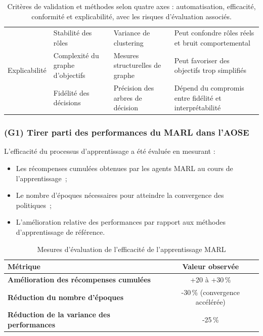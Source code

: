 \begin{table}[h!]
\begin{footnotesize}
\begin{tabular}{p{1.5cm}p{2.4cm}p{2.2cm}p{4.5cm}}
            \hline
            \multirow{3}{*}{Explicabilité}
                             & Stabilité des rôles              & Variance de clustering             & Peut confondre rôles réels et bruit comportemental                  \\
                             & Complexité du graphe d'objectifs & Mesures structurelles de graphe    & Peut favoriser des objectifs trop simplifiés                        \\
                             & Fidélité des décisions           & Précision des arbres de décision   & Dépend du compromis entre fidélité et interprétabilité              \\
            \hline
        \end{tabular}
        \caption{Critères de validation et méthodes selon quatre axes : automatisation, efficacité, conformité et explicabilité, avec les risques d'évaluation associés.}
        \label{tab:validation_strategy}
    \end{footnotesize}
\end{table}

\subsubsection{(G1) Tirer parti des performances du MARL dans l'AOSE}

L'efficacité du processus d'apprentissage a été évaluée en mesurant :
\begin{itemize}
    \item Les récompenses cumulées obtenues par les agents MARL au cours de l'apprentissage~;
    \item Le nombre d'époques nécessaires pour atteindre la convergence des politiques~;
    \item L'amélioration relative des performances par rapport aux méthodes d'apprentissage de référence.
\end{itemize}

\begin{table}[h!]
    \centering
    \caption{Mesures d'évaluation de l'efficacité de l'apprentissage MARL}
    \begin{tabular}{lc}
        \hline
        \textbf{Métrique}                                  & \textbf{Valeur observée}        \\
        \hline
        \textbf{Amélioration des récompenses cumulées}     & +20 à +30\,\%                   \\
        \hline
        \textbf{Réduction du nombre d'époques}             & -30\,\% (convergence accélérée) \\
        \hline
        \textbf{Réduction de la variance des performances} & -25\,\%                         \\
        \hline
    \end{tabular}
    \label{tab:efficiency}
\end{table}

